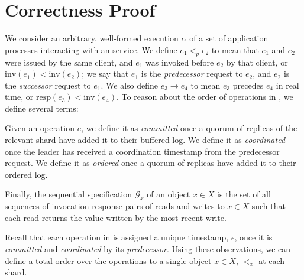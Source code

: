 \section{Correctness Proof}
\label{sec:correctness}
We consider an arbitrary, well-formed execution $\alpha$ of a set of application processes interacting with an \sys{} service. We define $e_1 <_p e_2$ to mean that $e_1$ and $e_2$ were issued by the same client, and $e_1$ was invoked before $e_2$ by that client, or $\text{inv}(e_1) < \text{inv}(e_2)$; we say that $e_1$ is the \textit{predecessor} request to $e_2$, and $e_2$ is the \textit{successor} request to $e_1$. We also define $e_3 \rightarrow e_4$ to mean $e_3$ precedes $e_4$ in real time, or $\text{resp}(e_3) < \text{inv}(e_4)$. To reason about the order of operations in \sys{}, we define several terms:

Given an operation $e$, we define it as \textit{committed} once a quorum of replicas of the relevant shard have added it to their buffered log.
We define it as \textit{coordinated} once the leader has received a coordination timestamp from the predecessor request.
We define it as \textit{ordered} once a quorum of replicas have added it to their ordered log.


Finally, the sequential specification $\mathcal{G}_x$ of an object $x \in X$ is the set of all sequences of invocation-response pairs of reads and writes to $x \in X$ such that each read returns the value written by the most recent write.

Recall that each operation in \sys{} is assigned a unique timestamp, $\epsilon$, once it is \textit{committed} and \textit{coordinated} by its \textit{predecessor}. Using these observations, we can define a total order over the operations to a single object $x \in X$, $<_x$ at each shard.

